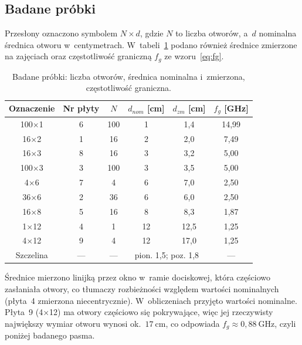 \documentclass[11pt,a4paper]{article}
\begin{document}
\subsection{Badane próbki}

Przesłony oznaczono symbolem $N\times d$, gdzie $N$ to liczba otworów, a~$d$ nominalna
średnica otworu w~centymetrach. W~tabeli~\ref{tab:probki} podano również średnice zmierzone na
zajęciach oraz częstotliwość graniczną $f_g$ ze wzoru~\eqref{eq:fg}.

\begin{table}[H]
  \centering
  \small
  \caption{Badane próbki: liczba otworów, średnica nominalna i~zmierzona, częstotliwość graniczna.}
  \label{tab:probki}
  \renewcommand{\arraystretch}{1.15}
  \begin{tabular}{|c|c|c|c|c|c|}
    \hline
    \textbf{Oznaczenie} & \textbf{Nr płyty} & $N$ & $d_{nom}$ [cm] & $d_{zm}$ [cm] & $f_g$ [GHz] \\
    \hline
    100$\times$1 & 6 & 100 & 1   & 1,4  & 14,99 \\ \hline
    16$\times$2  & 1 & 16  & 2   & 2,0  & 7,49 \\ \hline
    16$\times$3  & 8 & 16  & 3   & 3,2  & 5,00 \\ \hline
    100$\times$3 & 3 & 100 & 3   & 3,5  & 5,00 \\ \hline
    4$\times$6   & 7 & 4   & 6   & 7,0  & 2,50 \\ \hline
    36$\times$6  & 2 & 36  & 6   & 6,0  & 2,50 \\ \hline
    16$\times$8  & 5 & 16  & 8   & 8,3  & 1,87 \\ \hline
    1$\times$12  & 4 & 1   & 12  & 12,5 & 1,25 \\ \hline
    4$\times$12  & 9 & 4   & 12  & 17,0 & 1,25 \\ \hline
    Szczelina    & --- & --- & \multicolumn{2}{c|}{pion. 1,5; poz. 1,8} & --- \\ \hline
  \end{tabular}
\end{table}

Średnice mierzono linijką przez okno w~ramie dociskowej, która częściowo zasłaniała otwory,
co tłumaczy rozbieżności względem wartości nominalnych (płyta~4 zmierzona niecentrycznie).
W~obliczeniach przyjęto wartości nominalne. Płyta~9 (4$\times$12) ma otwory częściowo się
pokrywające, więc jej rzeczywisty największy wymiar otworu wynosi ok.~$17\ \mathrm{cm}$, co
odpowiada $f_g \approx 0{,}88\ \mathrm{GHz}$, czyli poniżej badanego pasma.
\end{document}
